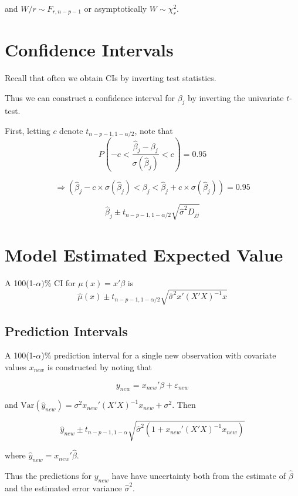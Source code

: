 \documentclass[
  letterpaper,
  DIV=11,
  numbers=noendperiod]{scrreport}
\begin{document}
and \(W/r \sim F_{r,n-p-1}\) or asymptotically \(W \sim \chi^2_r\).

\hypertarget{confidence-intervals}{%
\section{Confidence Intervals}\label{confidence-intervals}}

Recall that often we obtain CIs by inverting test statistics.

Thus we can construct a confidence interval for \(\beta_j\) by inverting
the univariate \(t\)-test.

First, letting \(c\) denote \(t_{n-p-1,1-\alpha/2}\), note that
\[P(-c < \frac{\hat \beta_j - \beta_j}{\sigma(\hat \beta_j)} < c) = 0.95\]

\[ \Longrightarrow (\hat \beta_j - c \times \sigma(\hat \beta_j) < \beta_j < \hat \beta_j + c \times \sigma(\hat \beta_j)) = 0.95\]

\[\hat \beta_j \pm t_{n - p -1, 1 - \alpha/2} \sqrt{\hat \sigma^2 D_{jj}}\]

\hypertarget{model-estimated-expected-value}{%
\section{Model Estimated Expected
Value}\label{model-estimated-expected-value}}

A 100(1-\(\alpha)\)\% CI for \(\mu(x) = x'\beta\) is
\[\hat \mu(x) \pm t_{n-p-1, 1-\alpha/2} \sqrt{\hat \sigma^2 x' (X' X)^{-1} x}\]

\hypertarget{prediction-intervals}{%
\subsection{Prediction Intervals}\label{prediction-intervals}}

A 100(1-\(\alpha\))\% prediction interval for a single new observation
with covariate values \(x_{new}\) is constructed by noting that

\[y_{new} = x_{new}' \beta  + \varepsilon_{new}\]

and
\(\text{Var}(\hat y_{new}) = \sigma^2 x_{new}' (X'X)^{-1}x_{new} + \sigma^2\).
Then

\[\hat y_{new} \pm t_{n-p-1, 1 -\alpha} \sqrt{ \hat \sigma^2 \left(1 + x_{new}' (X'X)^{-1} x_{new}\right)}\]

where \(\hat y_{new} = x_{new}' \hat \beta\).

Thus the predictions for \(y_{new}\) have have uncertainty both from the
estimate of \(\hat \beta\) and the estimated error variance
\(\hat \sigma^2\).
\end{document}
